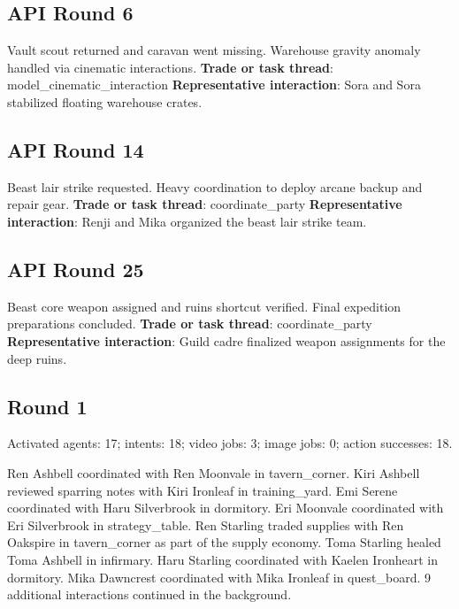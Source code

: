 \documentclass[11pt,a4paper]{article}
\begin{document}
\subsection{API Round 6}
Vault scout returned and caravan went missing. Warehouse gravity anomaly handled via cinematic interactions.
\newline \textbf{Trade or task thread}: model\_cinematic\_interaction
\newline \textbf{Representative interaction}: Sora and Sora stabilized floating warehouse crates.

\subsection{API Round 14}
Beast lair strike requested. Heavy coordination to deploy arcane backup and repair gear.
\newline \textbf{Trade or task thread}: coordinate\_party
\newline \textbf{Representative interaction}: Renji and Mika organized the beast lair strike team.

\subsection{API Round 25}
Beast core weapon assigned and ruins shortcut verified. Final expedition preparations concluded.
\newline \textbf{Trade or task thread}: coordinate\_party
\newline \textbf{Representative interaction}: Guild cadre finalized weapon assignments for the deep ruins.

\subsection{Round 1}
Activated agents: 17; intents: 18; video jobs: 3; image jobs: 0; action successes: 18.

Ren Ashbell coordinated with Ren Moonvale in tavern\_corner. Kiri Ashbell reviewed sparring notes with Kiri Ironleaf in training\_yard. Emi Serene coordinated with Haru Silverbrook in dormitory. Eri Moonvale coordinated with Eri Silverbrook in strategy\_table. Ren Starling traded supplies with Ren Oakspire in tavern\_corner as part of the supply economy. Toma Starling healed Toma Ashbell in infirmary. Haru Starling coordinated with Kaelen Ironheart in dormitory. Mika Dawncrest coordinated with Mika Ironleaf in quest\_board. 9 additional interactions continued in the background.
\end{document}
